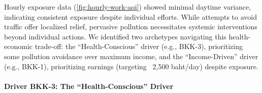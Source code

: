 Hourly exposure data (\autoref{fig:hourly-work-aqi}) showed minimal daytime variance,
indicating consistent exposure despite individual efforts.
While attempts to avoid traffic offer localized relief, pervasive pollution necessitates systemic interventions beyond individual actions.
We identified two archetypes navigating this health-economic trade-off: the ``Health-Conscious'' driver (e.g., BKK-3),
prioritizing some pollution avoidance over maximum income,
and the ``Income-Driven'' driver (e.g., BKK-1), prioritizing earnings (targeting ~2,500 baht/day) despite exposure.

\paragraph{Driver BKK-3: The ``Health-Conscious'' Driver} 









